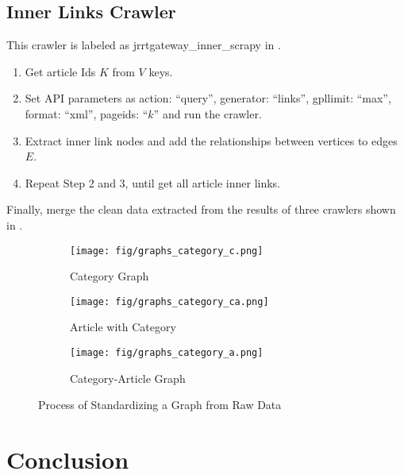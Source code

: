 \subsection{Inner Links Crawler}

This crawler is labeled as jrrtgateway\_inner\_scrapy in .

\begin{enumerate}
	\item Get article Ids $K$ from $V$ keys.
	\item Set API parameters as {action: ``query'', generator: ``links'', gpllimit: ``max'', format: ``xml'', pageids: ``$k$''} and run the crawler. 
	\item Extract inner link nodes and add the relationships between vertices to edges $E$.
	\item Repeat Step 2 and 3, until get all article inner links.
\end{enumerate}

Finally, merge the clean data extracted from the results of three crawlers shown in .

\begin{figure}
	\centering
	\begin{subfigure}{0.31\textwidth}
		\texttt{[image: fig/graphs\_category\_c.png]}
		\caption{Category Graph} 
		\label{fig:section2-pic2}
	\end{subfigure}
	\hspace*{\fill} %
	\begin{subfigure}{0.31\textwidth}
		\texttt{[image: fig/graphs\_category\_ca.png]}
		\caption{Article with Category} \label{fig:section2-pic3}
	\end{subfigure}
	\hspace*{\fill} %
	\begin{subfigure}{0.31\textwidth}
		\texttt{[image: fig/graphs\_category\_a.png]}
		\caption{Category-Article Graph} \label{fig:section2-pic4}
	\end{subfigure}
	\caption{Process of Standardizing a Graph from Raw Data} \label{fig:section2-pic234}
\end{figure}

\section{Conclusion}




